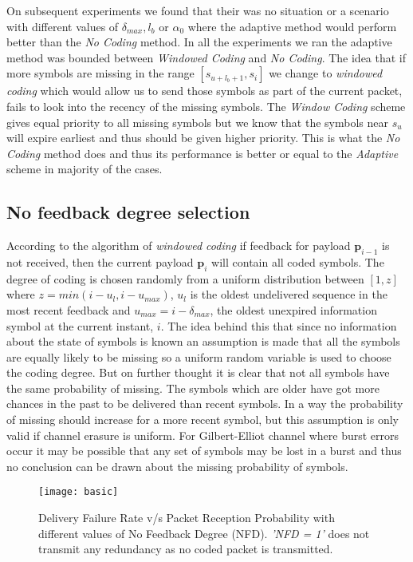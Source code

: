 On subsequent experiments we found that their was no situation or a scenario with different values of $\delta_{max}, l_b$ or $\alpha_0$ where the adaptive method would perform better than the \textit{No Coding} method. In all the experiments we ran the adaptive method was bounded between \textit{Windowed Coding} and \textit{No Coding}. The idea that if more symbols are missing in the range $[s_{u+l_b+1}, s_i]$ we change to \textit{windowed coding} which would allow us to send those symbols as part of the current packet, fails to look into the recency of the missing symbols. The \textit{Window Coding} scheme gives equal priority to all missing symbols but we know that the symbols near $s_u$ will expire earliest and thus should be given higher priority. This is what the \textit{No Coding} method does and thus its performance is better or equal to the \textit{Adaptive} scheme in majority of the cases. 

\subsection{No feedback degree selection}

According to the algorithm of \textit{windowed coding} if feedback for payload $\mathbf{p}_{i-1}$ is not received, then the current payload $\mathbf{p}_{i}$ will contain all coded symbols. The degree of coding is chosen randomly from a uniform distribution between $[1, z]$ where $z = min(i-u_l, i-u_{max})$, $u_l$ is the oldest undelivered sequence in the most recent feedback and $u_{max} = i-\delta_{max}$, the oldest unexpired information symbol at the current instant, $i$. The idea behind this that since no information about the state of symbols is known an assumption is made that all the symbols are equally likely to be missing so a uniform random variable is used to choose the coding degree. But on further thought it is clear that not all symbols have the same probability of missing. The symbols which are older have got more chances in the past to be delivered than recent symbols. In a way the probability of missing should increase for a more recent symbol, but this assumption is only valid if channel erasure is uniform. For Gilbert-Elliot channel where burst errors occur it may be possible that any set of symbols may be lost in a burst and thus no conclusion can be drawn about the missing probability of symbols.

\begin{figure}[h]
	\centering
	\texttt{[image: basic]}
	\caption{Delivery Failure Rate v/s Packet Reception Probability with different values of No Feedback Degree (NFD). \textit{'NFD = 1'} does not transmit any redundancy as no coded packet is transmitted. }
	\label{basic}
\end{figure}

